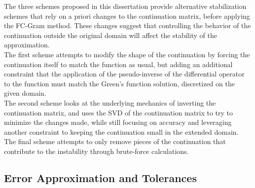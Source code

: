 \documentclass[11pt]{amsart}
\begin{document}
The three schemes proposed in this dissertation provide alternative stabilization schemes that rely on a priori changes to the continuation matrix, before applying the FC-Gram method. These changes suggest that controlling the behavior of the continuation outside the original domain will affect the stability of the approximation.  \\
The first scheme attempts to modify the shape of the continuation by forcing the continuation itself to match the function as usual, but adding an additional constraint that the application of the pseudo-inverse of the differential operator to the function must match the Green's function solution, discretized on the given domain. \\
The second scheme looks at the underlying mechanics of inverting the continuation matrix, and uses the SVD of the continuation matrix to try to minimize the changes made, while still focusing on accuracy and leveraging another constraint to keeping the continuation small in the extended domain.  \\
The final scheme attempts to only remove pieces of the continuation that contribute to the instability through brute-force calculations. 





\subsection{Error Approximation and Tolerances}
%
%
%
\end{document}
